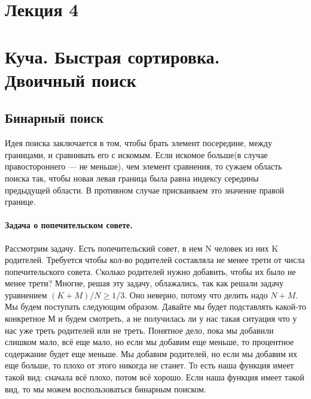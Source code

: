 \documentclass[12pt]{article}
\begin{document}
\newpage
\section*{Лекция 4}
\section*{Куча. Быстрая сортировка. Двоичный поиск}
\subsection*{Бинарный поиск}
Идея поиска заключается в том, чтобы брать элемент посередине, между границами, и сравнивать его с искомым. Если искомое больше(в случае правостороннего — не меньше), чем элемент сравнения, то сужаем область поиска так, чтобы новая левая граница была равна индексу середины предыдущей области. В противном случае присваиваем это значение правой границе.
\paragraph{Задача о попечительском совете.}
Рассмотрим задачу. Есть попечительский совет, в нем N человек из них K родителей. Требуется чтобы кол-во родителей составляла не менее трети от числа попечительского совета. Cколько родителей нужно добавить, чтобы их было не менее трети? Многие, решая эту задачу, облажались, так как решали задачу уравнением $(K + M)/N \geq 1/3$. Оно неверно, потому что делить надо $N+M$. Мы будем поступать следующим образом. Давайте мы будет подставлять какой-то конкретное М и будем смотреть, а не получилась ли у нас такая ситуация что у нас уже треть родителей или не треть. Понятное дело, пока мы добавили слишком мало, всё еще мало, но если мы добавим еще меньше, то процентное содержание будет еще меньше. Мы добавим родителей, но если мы добавим их еще больше, то плохо от этого никогда не станет. То есть наша функция имеет такой вид: сначала всё плохо, потом всё хорошо. Если наша функция имеет такой вид, то мы можем воспользоваться бинарным поиском.
\end{document}
